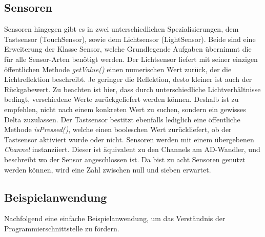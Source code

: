 \subsection{Sensoren}
Sensoren hingegen gibt es in zwei unterschiedlichen Spezialisierungen, dem Tastsensor (TouchSensor), sowie dem Lichtsensor (LightSensor). Beide sind eine Erweiterung der Klasse Sensor, welche Grundlegende Aufgaben übernimmt die für alle Sensor-Arten benötigt werden. Der Lichtsensor liefert mit seiner einzigen öffentlichen Methode \emph{getValue()} einen numerischen Wert zurück, der die Lichtreflektion beschreibt. Je geringer die Reflektion, desto kleiner ist auch der Rückgabewert. Zu beachten ist hier, dass durch unterschiedliche Lichtverhältnisse bedingt, verschiedene Werte zurückgeliefert werden können. Deshalb ist zu empfehlen, nicht nach einem konkreten Wert zu suchen, sondern ein gewisses Delta zuzulassen. Der Tastsensor bestitzt ebenfalls lediglich eine öffentliche Methode \emph{isPressed()}, welche einen booleschen Wert zurückliefert, ob der Tastsensor aktiviert wurde oder nicht. Sensoren werden mit einem übergebenen \emph{Channel} instanziiert. Dieser ist äquivalent zu den Channels am AD-Wandler, und beschreibt wo der Sensor angeschlossen ist. Da bist zu acht Sensoren genutzt werden können, wird eine Zahl zwischen null und sieben erwartet.

\subsection{Beispielanwendung}

Nachfolgend eine einfache Beispielanwendung, um das Verständnis der Programmierschnittstelle zu fördern.



